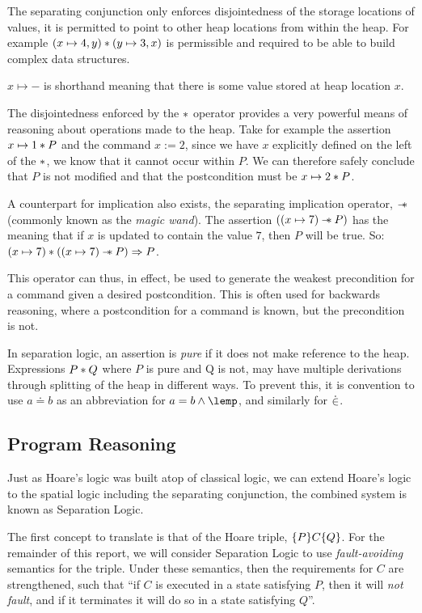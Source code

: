 \documentclass[a4paper,notitlepage]{report}
\begin{document}
  The separating conjunction only enforces disjointedness of the storage
  locations of values, it is permitted to point to other heap locations from
  within the heap. For example $(x \mapsto 4, y) \mathbin{*} (y \mapsto 3, x)$ is
  permissible and required to be able to build complex data structures.
  

  $x \mapsto -$ is shorthand meaning that there is some value stored at heap
  location $x$.

  The disjointedness enforced by the $\mathbin{*}$ operator provides a very powerful
  means of reasoning about operations made to the heap. Take for example the
  assertion $x \mapsto 1 \mathbin{*} P$ and the command $x := 2$, since we have $x$
  explicitly defined on the left of the $\mathbin{*}$, we know that it cannot occur
  within $P$. We can therefore safely conclude that $P$ is not modified and that
  the postcondition must be $x \mapsto 2 \mathbin{*} P$.

  A counterpart for implication also exists,
  the separating implication operator, $\mathbin{-\mkern-6mu *}$ (commonly known as the
  \emph{magic wand}). The assertion $((x
  \mapsto 7) \mathbin{-\mkern-6mu *} P)$ has the meaning that if $x$ is updated to contain the
  value $7$, then $P$ will be true. So: $(x \mapsto 7) \mathbin{*} ((x \mapsto 7) \mathbin{-\mkern-6mu *}
  P) \Rightarrow P$.

  This operator can thus, in effect, be
  used to generate the weakest precondition for a command given a desired
  postcondition. This is often used for backwards reasoning, where a
  postcondition for a command is known, but the precondition is not.

  In separation logic, an assertion is \emph{pure} if it does not make reference
  to the heap. Expressions $P \mathbin{*} Q$ where $P$ is pure and Q is not, may have
  multiple derivations through splitting of the heap in different ways. To
  prevent this, it is convention to use $a \doteq b$ as an abbreviation for
  $a = b \land \lemp$, and similarly for $\mathbin{\dot\in}$.

  \subsection{Program Reasoning}
  \label{subsec:programreasoning}

  Just as Hoare's logic was built atop of classical logic, we can extend
  Hoare's logic to the spatial logic including the separating conjunction,
  the combined system is known as Separation Logic.

  The first concept to translate is that of the Hoare triple, $\{P\}C\{Q\}$.
  For the remainder of this report, we will consider Separation Logic to use
  \emph{fault-avoiding} semantics for the triple. Under these semantics, then the
  requirements for $C$ are strengthened, such that ``if $C$ is executed in a
  state satisfying $P$, then it will \emph{not fault}, and if it terminates it
  will do so in a state satisfying $Q$''.
\end{document}
